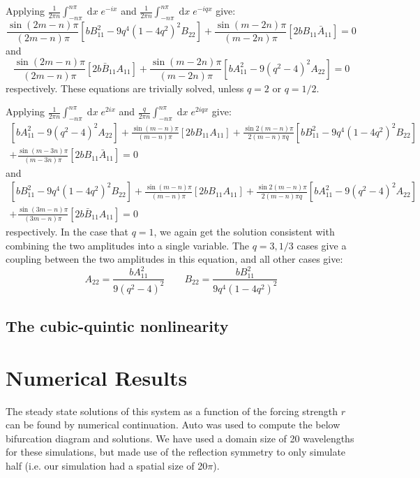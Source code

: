 \documentclass[api,pof,pre,12pt,a4paper]{revtex4-1}
\newcommand{\beqn}{\begin{equation}}
\newcommand{\eeqn}{\end{equation}}
\begin{document}
Applying $\tfrac{1}{2\pi n }\int_{- n\pi}^{n\pi}  \; \text{d}x\; e^{-ix}$ and $\tfrac{1}{2\pi n }\int_{- n\pi}^{n\pi}  \; \text{d}x\; e^{-i q x}$ give:
\beqn
\frac{\sin(2m-n) \pi  }{(2m-n)\pi } \left[b B_{11}^2-9q^4 (1-4q^2)^2 B_{22}\right] +\frac{ \sin (m-2n)\pi }{(m-2n)\pi} \left[2bB_{11}\bar{A}_{11} \right]=0
\eeqn
and
\beqn
\frac{\sin(2m-n) \pi  }{(2m-n)\pi }\left[2b\bar{B}_{11} A_{11} \right]  +\frac{ \sin (m-2n)\pi }{(m-2n)\pi} \left[b A_{11}^2-9 (q^2-4)^2 A_{22}\right]=0
\eeqn
respectively.  These equations are trivially solved, unless $q=2$ or $q=1/2$.  

Applying $\tfrac{1}{2\pi n}\int_{-n \pi}^{ n\pi}  \; \text{d}x\; e^{2i x}$  and $\tfrac{q}{2\pi n}\int_{-n\pi}^{n\pi}  \; \text{d}x\; e^{2iqx}$ give:
\begin{align}
\left[b A_{11}^2-9 (q^2-4)^2 A_{22}\right]+\frac{ \sin(m-n)\pi }{(m-n)\pi} \left[2bB_{11}A_{11}\right]
+\frac{\sin2(m-n) \pi  }{2(m-n)\pi q} \left[b B_{11}^2-9q^4 (1-4q^2)^2 B_{22}\right]\nonumber \\
+\frac{ \sin(m-3n)\pi }{(m-3n)\pi} \left[2bB_{11}\bar{A}_{11}\right]=0
\end{align}
and
\begin{align}
\left[b B_{11}^2-9q^4 (1-4q^2)^2 B_{22}\right]+\frac{ \sin(m-n)\pi }{(m-n)\pi} \left[2bB_{11}A_{11}\right]
+\frac{\sin2(m-n) \pi  }{2(m-n)\pi q} \left[b A_{11}^2-9 (q^2-4)^2 A_{22}\right]\nonumber \\
+\frac{ \sin(3m-n)\pi }{(3m-n)\pi} \left[2b\bar{B}_{11}A_{11}\right]=0
\end{align}
respectively.  In the case that $q=1$, we again get the solution consistent with combining the two amplitudes into a single variable.  The $q=3,1/3$ cases give a coupling between the two amplitudes in this equation, and all other cases give:
\beqn
A_{22}=\frac{bA_{11}^2}{9 (q^2-4)^2} \qquad B_{22}=\frac{bB_{11}^2}{9q^4 (1-4q^2)^2}
\eeqn


\subsection{The cubic-quintic nonlinearity}



\section{Numerical Results}
The steady state solutions of this system as a function of the forcing strength $r$ can be found by numerical continuation.  Auto was used to compute the below bifurcation diagram and solutions.  We have used a domain size of 20 wavelengths for these simulations, but made use of the reflection symmetry to only simulate half (i.e. our simulation had a spatial size of 20$\pi$).  
\end{document}
